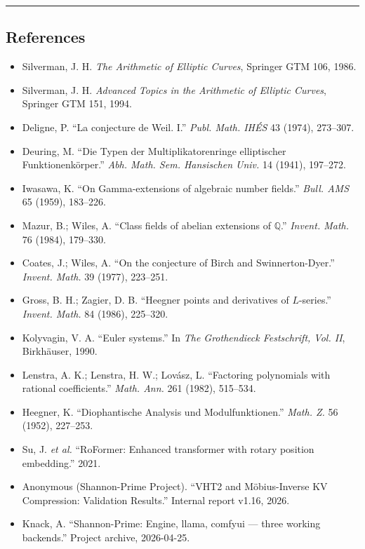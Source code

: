 \documentclass[
  11pt,
]{article}
\providecommand{\tightlist}{%
  \setlength{\itemsep}{0pt}\setlength{\parskip}{0pt}}
\begin{document}
\begin{center}\rule{0.5\linewidth}{0.5pt}\end{center}

\hypertarget{references}{%
\subsection{References}\label{references}}

\begin{itemize}
\tightlist
\item
  Silverman, J. H. \emph{The Arithmetic of Elliptic Curves}, Springer
  GTM 106, 1986.
\item
  Silverman, J. H. \emph{Advanced Topics in the Arithmetic of Elliptic
  Curves}, Springer GTM 151, 1994.
\item
  Deligne, P. ``La conjecture de Weil. I.'' \emph{Publ. Math. IHÉS} 43
  (1974), 273--307.
\item
  Deuring, M. ``Die Typen der Multiplikatorenringe elliptischer
  Funktionenkörper.'' \emph{Abh. Math. Sem. Hansischen Univ.} 14 (1941),
  197--272.
\item
  Iwasawa, K. ``On Gamma-extensions of algebraic number fields.''
  \emph{Bull. AMS} 65 (1959), 183--226.
\item
  Mazur, B.; Wiles, A. ``Class fields of abelian extensions of
  \(\mathbb{Q}\).'' \emph{Invent. Math.} 76 (1984), 179--330.
\item
  Coates, J.; Wiles, A. ``On the conjecture of Birch and
  Swinnerton-Dyer.'' \emph{Invent. Math.} 39 (1977), 223--251.
\item
  Gross, B. H.; Zagier, D. B. ``Heegner points and derivatives of
  \(L\)-series.'' \emph{Invent. Math.} 84 (1986), 225--320.
\item
  Kolyvagin, V. A. ``Euler systems.'' In \emph{The Grothendieck
  Festschrift, Vol. II}, Birkhäuser, 1990.
\item
  Lenstra, A. K.; Lenstra, H. W.; Lovász, L. ``Factoring polynomials
  with rational coefficients.'' \emph{Math. Ann.} 261 (1982), 515--534.
\item
  Heegner, K. ``Diophantische Analysis und Modulfunktionen.''
  \emph{Math. Z.} 56 (1952), 227--253.
\item
  Su, J. \emph{et al.} ``RoFormer: Enhanced transformer with rotary
  position embedding.'' 2021.
\item
  Anonymous (Shannon-Prime Project). ``VHT2 and Möbius-Inverse KV
  Compression: Validation Results.'' Internal report v1.16, 2026.
\item
  Knack, A. ``Shannon-Prime: Engine, llama, comfyui --- three working
  backends.'' Project archive, 2026-04-25.
\end{itemize}
\end{document}
